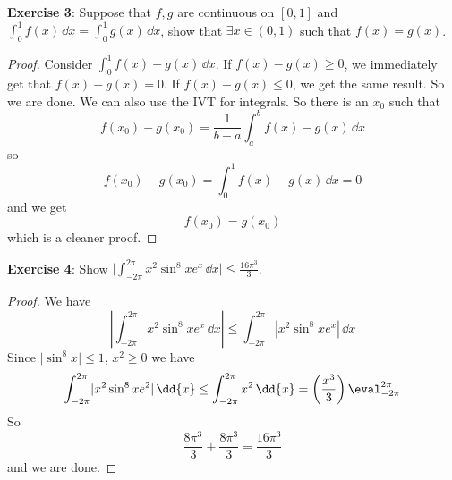 \documentclass{article}
\begin{document}
\textbf{Exercise 3}: Suppose that $f, g$ are continuous on $[0, 1]$ and $\int_{0}^{1} f(x) \, \dd{x} = \int_{0}^{1} g(x) \, \dd{x} $, show that $\exists x \in (0, 1)$ such that $f(x) = g(x)$.
    \begin{proof}
        Consider $\int_{0}^{1} f(x) - g(x) \, \dd{x} $. If $f(x) - g(x) \geq 0$, we immediately get that $f(x) - g(x) = 0$. If $f(x) - g(x) \leq 0$, we get the same result. So we are done. We can also use the IVT for integrals. So there is an $x_{0}$ such that 
            \begin{equation*}
                f(x_{0}) - g(x_{0}) = \dfrac{1}{b - a}\int_{a}^{b} f(x) - g(x) \, \dd{x} 
            \end{equation*}
        so
            \begin{equation*}
                f(x_{0}) - g(x_{0}) = \int_{0}^{1} f(x) - g(x) \, \dd{x}  = 0
            \end{equation*}
        and we get 
            \begin{equation*}
                f(x_{0}) = g(x_{0})
            \end{equation*}
        which is a cleaner proof.
    \end{proof}

\textbf{Exercise 4}: Show $\lvert \int_{-2\pi}^{2\pi} x^{2}\sin^{8}{x}{e^{x}} \, \dd{x}  \rvert \leq \frac{16\pi^{3}}{3}$.
    \begin{proof}
        We have 
            \begin{equation*}
                \left\lvert \int_{-2\pi}^{2\pi} x^{2}\sin^{8}{x}e^{x} \, \dd{x}  \right\rvert \leq \int_{-2\pi}^{2\pi} \left\lvert x^{2}\sin^{8}{x}e^{x} \right\rvert \, \dd{x} 
            \end{equation*}
        Since $\lvert \sin^{8}{x} \rvert \leq 1$, $x^{2} \geq 0$ we have 
            \begin{equation*}
                \int_{-2\pi}^{2\pi} \lvert x^{2}\sin^{8}{x}e^{2} \rvert \, \dd{x}  \leq \int_{-2\pi}^{2\pi} x^{2} \, \dd{x}  = \left(\dfrac{x^{3}}{3}\right)\eval_{-2\pi}^{2\pi}
            \end{equation*}
        So
            \begin{equation*}
                \dfrac{8\pi^{3}}{3} + \dfrac{8\pi^{3}}{3} = \dfrac{16\pi^{3}}{3}
            \end{equation*}
        and we are done.
    \end{proof}
\end{document}
